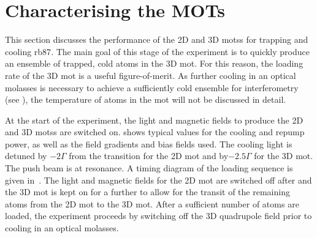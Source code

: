 \section{Characterising the MOTs}\label{sec:mot_characterisation}
This section discusses the performance of the 2D and 3D \acp{mots} for trapping
and cooling \ac{rb87}. The main goal of this stage of the experiment is to
quickly produce an ensemble of trapped, cold atoms in the 3D \ac{mot}. For this
reason, the loading rate of the 3D \ac{mot} is a useful figure-of-merit. As
further cooling in an optical molasses is necessary to achieve a sufficiently
cold ensemble for interferometry (see ), the
temperature of atoms in the \ac{mot} will not be discussed in detail.
\par\noindent \nocite{Haw2012}
At the start of the experiment, the light and magnetic fields to produce the 2D
and 3D \acp{mots} are switched on.  shows
typical values for the cooling and repump power, as well as the field gradients
and bias fields used. The cooling light is detuned by \(-2 \Gamma\) from the
 transition for the 2D \ac{mot} and by\(-2.5 \Gamma\) for the 3D
\ac{mot}. The push beam is at resonance. A timing diagram of the loading sequence is given in~. The light and magnetic fields
for the 2D \ac{mot} are switched off after  and the
3D \ac{mot} is kept on for a further  to allow for
the transit of the remaining atoms from the 2D \ac{mot} to the 3D \ac{mot}.
After a sufficient number of atoms are loaded, the experiment proceeds by
switching off the 3D quadrupole field prior to cooling in an optical molasses.
